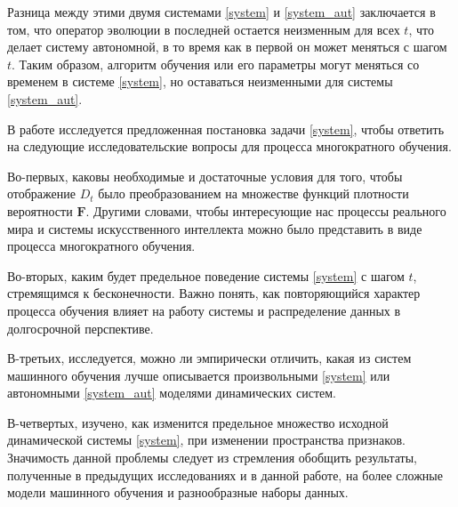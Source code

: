 Разница между этими двумя системами \eqref{system} и \eqref{system_aut} заключается в том, что оператор эволюции в последней остается неизменным для всех $t$, что делает систему автономной, в то время как в первой он может меняться с шагом $t$. Таким образом, алгоритм обучения или его параметры могут меняться со временем в системе \eqref{system}, но оставаться неизменными для системы \eqref{system_aut}.

В работе исследуется предложенная постановка задачи \eqref{system}, чтобы ответить на следующие исследовательские вопросы для процесса многократного обучения.

Во-первых, каковы необходимые и достаточные условия для того, чтобы отображение $D_t$ было преобразованием на множестве функций плотности вероятности $\textbf{F}$. Другими словами, чтобы интересующие нас процессы реального мира и системы искусственного интеллекта можно было представить в виде процесса многократного обучения.

Во-вторых, каким будет предельное поведение системы \eqref{system} с шагом $t$, стремящимся к бесконечности. Важно понять, как повторяющийся характер процесса обучения влияет на работу системы и распределение данных в долгосрочной перспективе.

В-третьих, исследуется, можно ли эмпирически отличить, какая из систем машинного обучения лучше описывается произвольными \eqref{system} или автономными \eqref{system_aut} моделями динамических систем.

В-четвертых, изучено, как изменится предельное множество исходной динамической системы \eqref{system}, при изменении пространства признаков. Значимость данной проблемы следует из стремления обобщить результаты, полученные в предыдущих исследованиях \cite{khritankov2021hidden, khritankov2023positive} и в данной работе, на более сложные модели машинного обучения и разнообразные наборы данных. 

